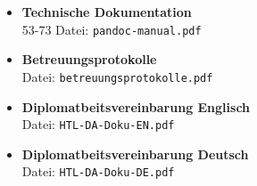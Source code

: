 \documentclass[
    headings=optiontotocandhead,%
    twoside,
    numbers=noenddot,%
    12pt, %
    titlepage, %
    parskip=full, %
    listof=leveldown, 
    numbers=noenddot, %
    a4paper,DIV=14,
    BCOR=15mm,
]{scrbook}
\begin{document}
\begin{itemize}

\item \textbf{Technische Dokumentation}\\  53-73   Datei: \texttt{pandoc-manual.pdf}
\item \textbf{Betreuungsprotokolle}\\  Datei: \texttt{betreuungsprotokolle.pdf}
\item \textbf{Diplomatbeitsvereinbarung Englisch}\\  Datei: \texttt{HTL-DA-Doku-EN.pdf}
\item \textbf{Diplomatbeitsvereinbarung Deutsch}\\  Datei: \texttt{HTL-DA-Doku-DE.pdf}
\end{itemize}
\end{document}
